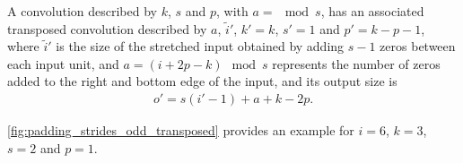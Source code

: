 \documentclass{article}
\begin{document}
\begin{prop}\label{prop:padding_strides_transposed_odd}
A convolution described by $k$, $s$ and $p$, with $a = \mod s$,
has an associated transposed convolution described by $a$, $\tilde{i}'$,
$k' = k$, $s' = 1$ and $p' = k - p - 1$, where
$\tilde{i}'$ is the size of the stretched input obtained by adding $s - 1$ zeros
between each input unit, and $a = (i + 2p - k) \mod s$ represents the number of
zeros added to the right and bottom edge of the input, and its output size is
\begin{equation*}
\begin{split}
    o' = s (i' - 1) + a + k - 2p.
\end{split}
\end{equation*}
\end{prop}

\autoref{fig:padding_strides_odd_transposed} provides an example for $i = 6$, $k
= 3$, $s = 2$ and $p = 1$.

\newpage


\end{document}
